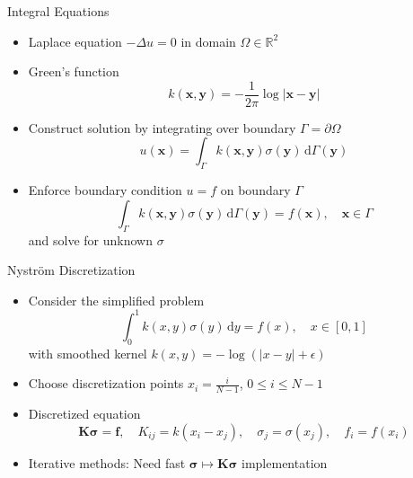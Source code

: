 \documentclass[aspectratio=169]{beamer}
\renewcommand{\Vec}[1]{\bm{#1}}
\newcommand{\Mat}[1]{\mathbf{#1}}
\newcommand{\D}{\,\mathrm{d}}
\newcommand{\RR}{\mathbb{R}}
\begin{document}
\begin{frame}{Integral Equations}
  \begin{itemize}
    \item
      Laplace equation $-\Delta u = 0$ in domain $\Omega \in \RR^2$
    \item
      Green's function
      \begin{equation*}
        k(\Vec{x}, \Vec{y}) = -\frac{1}{2\pi} \log{\lvert \Vec{x} - \Vec{y}
        \rvert}
      \end{equation*}
    \item
      Construct solution by integrating over boundary $\Gamma = \partial\Omega$
      \begin{equation*}
        u(\Vec{x}) = \int_\Gamma k(\Vec{x}, \Vec{y}) \sigma(\Vec{y})
        \D\Gamma(\Vec{y})
      \end{equation*}
    \item
      Enforce boundary condition $u = f$ on boundary $\Gamma$
      \begin{equation*}
        \int_\Gamma k(\Vec{x}, \Vec{y}) \sigma(\Vec{y}) \D\Gamma(\Vec{y}) =
        f(\Vec{x}), \quad \Vec{x} \in \Gamma
      \end{equation*}
      and solve for unknown $\sigma$
  \end{itemize}
\end{frame}

\begin{frame}{Nystr\"om Discretization}
  \begin{itemize}
    \item
      Consider the simplified problem
      \begin{equation*}
        \int_0^1 k(x, y) \sigma(y) \D{y} = f(x), \quad x \in [0, 1]
      \end{equation*}
      with smoothed kernel $k(x, y) = -\log{(\lvert x - y \rvert + \epsilon)}$
    \item
      Choose discretization points $x_i = \frac{i}{N - 1}$, $0 \leq i \leq N -
      1$
    \item
      Discretized equation
      \begin{equation*}
        \Mat{K} \Vec{\sigma} = \Vec{f}, \quad K_{ij} = k(x_i - x_j), \quad
        \sigma_j = \sigma(x_j), \quad f_i = f(x_i)
      \end{equation*}
    \item
      Iterative methods: Need fast $\Vec{\sigma} \mapsto \Mat{K} \Vec{\sigma}$
      implementation
  \end{itemize}
\end{frame}
\end{document}
